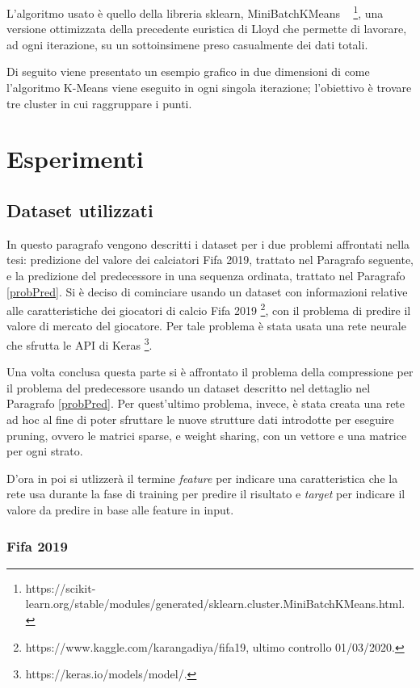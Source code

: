\documentclass[12pt]{report}
\begin{document}


L’algoritmo usato è quello della libreria sklearn, MiniBatchKMeans ~\cite{KMeansMiniBatch} \footnote{https://scikit-learn.org/stable/modules/generated/sklearn.cluster.MiniBatchKMeans.html.}, una versione ottimizzata della precedente euristica di Lloyd che permette di lavorare, ad ogni iterazione, su un sottoinsimene preso casualmente dei dati totali.
\null\par\null
Di seguito viene presentato un esempio grafico in due dimensioni di come l'algoritmo K-Means viene eseguito in ogni singola iterazione; l'obiettivo è trovare tre cluster in cui raggruppare i punti.

\chapter{Esperimenti}

\section{Dataset utilizzati}
In questo paragrafo vengono descritti i dataset per i due problemi affrontati nella tesi: predizione del valore dei calciatori Fifa 2019, trattato nel Paragrafo seguente, e la predizione del predecessore in una sequenza ordinata, trattato nel Paragrafo \ref{probPred}.
Si è deciso di cominciare usando un dataset con informazioni relative alle caratteristiche dei giocatori di calcio Fifa 2019 \footnote{https://www.kaggle.com/karangadiya/fifa19, ultimo controllo 01/03/2020.}, con il problema di predire il valore di mercato del giocatore. Per tale problema è stata usata una rete neurale che sfrutta le API di Keras \footnote{https://keras.io/models/model/.}.

Una volta conclusa questa parte si è affrontato il problema della compressione per il problema del predecessore usando un dataset descritto nel dettaglio nel Paragrafo \ref{probPred}. Per quest'ultimo problema, invece, è stata creata una rete ad hoc al fine di poter sfruttare le nuove strutture dati introdotte per eseguire pruning, ovvero le matrici sparse, e weight sharing, con un vettore e una matrice per ogni strato.

D'ora in poi si utlizzerà il termine \textit{feature} per indicare una caratteristica che la rete usa durante la fase di training per predire il risultato e \textit{target} per indicare il valore da predire in base alle feature in input.

\subsection{Fifa 2019}
\end{document}
